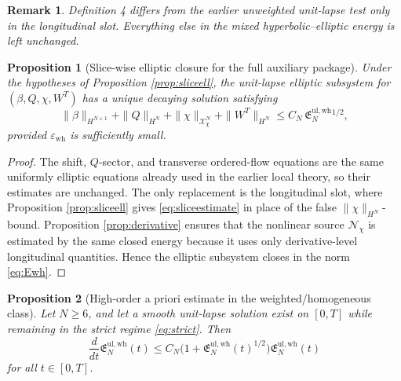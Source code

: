 \documentclass[11pt]{article}
\newtheorem{proposition}{Proposition}
\newtheorem{remark}{Remark}
\begin{document}
\begin{remark}
Definition 4 differs from the earlier unweighted unit-lapse test only in the longitudinal slot. Everything else in the mixed hyperbolic--elliptic energy is left unchanged.
\end{remark}

\begin{proposition}[Slice-wise elliptic closure for the full auxiliary package]
\label{prop:fullell}
Under the hypotheses of Proposition \ref{prop:sliceell}, the unit-lapse elliptic subsystem for \((\beta,Q,\chi,W^T)\) has a unique decaying solution satisfying
\begin{equation}
\|\beta\|_{H^{N+1}}
+ \|Q\|_{H^N}
+ \|\chi\|_{\mathcal X_\chi^N}
+ \|W^T\|_{H^N}
\le
C_N\,\mathfrak E_N^{\mathrm{ul,wh}}{}^{1/2},
\label{eq:fullell}
\end{equation}
provided \(\varepsilon_{\mathrm{wh}}\) is sufficiently small.
\end{proposition}

\begin{proof}
The shift, \(Q\)-sector, and transverse ordered-flow equations are the same uniformly elliptic equations already used in the earlier local theory, so their estimates are unchanged. The only replacement is the longitudinal slot, where Proposition \ref{prop:sliceell} gives \eqref{eq:sliceestimate} in place of the false \(\|\chi\|_{H^N}\)-bound. Proposition \ref{prop:derivative} ensures that the nonlinear source \(\mathcal N_\chi\) is estimated by the same closed energy because it uses only derivative-level longitudinal quantities. Hence the elliptic subsystem closes in the norm \eqref{eq:Ewh}.
\end{proof}

\begin{proposition}[High-order a priori estimate in the weighted/homogeneous class]
\label{prop:apriori}
Let \(N\ge 6\), and let a smooth unit-lapse solution exist on \([0,T]\) while remaining in the strict regime \eqref{eq:strict}. Then
\begin{equation}
\frac{d}{dt}\mathfrak E_N^{\mathrm{ul,wh}}(t)
\le
C_N\bigl(1+\mathfrak E_N^{\mathrm{ul,wh}}(t)^{1/2}\bigr)\mathfrak E_N^{\mathrm{ul,wh}}(t)
\label{eq:apriori}
\end{equation}
for all \(t\in[0,T]\).
\end{proposition}
\end{document}
